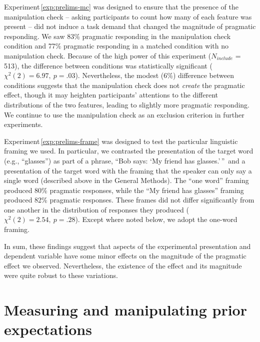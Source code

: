 \documentclass[man,noapacite]{apa2}
\newcounter{Experiment}
\newcommand{\exptref}[1]{Experiment\,\ref{#1}}
\begin{document}
\exptref{exp:prelims-mc} was designed to ensure that the presence of the manipulation check -- asking participants to count how many of each feature was present -- did not induce a task demand that changed the magnitude of pragmatic responding. We saw 83\% pragmatic responding in the manipulation check condition and 77\% pragmatic responding in a matched condition with no manipulation check. Because of the high power of this experiment ($N_{include}$ = 513), the difference between conditions was statistically significant ($\chi^2(2) = 6.97,~p = .03$). Nevertheless, the modest (6\%) difference between conditions suggests that the manipulation check does not \emph{create} the pragmatic effect, though it may heighten participants' attentions to the different distributions of the two features, leading to slightly more pragmatic responding. We continue to use the manipulation check as an exclusion criterion in further experiments.

\exptref{exp:prelims-frame} was designed to test the particular linguistic framing we used. In particular, we contrasted the presentation of the target word (e.g., ``glasses'') as part of a phrase, ``Bob says: `My friend has glasses.'\,''\ and a presentation of the target word with the framing that the speaker can only say a single word (described above in the General Methods). The ``one word'' framing produced 80\% pragmatic responses, while the ``My friend has glasses'' framing produced 82\% pragmatic responses. These frames did not differ significantly from one another in the distribution of responses they produced ($\chi^2(2) = 2.54,~p = .28$). Except where noted below, we adopt the one-word framing.

In sum, these findings suggest that aspects of the experimental presentation and dependent variable have some minor effects on the magnitude of the pragmatic effect we observed. Nevertheless, the existence of the effect and its magnitude were quite robust to these variations.

\section{Measuring and manipulating prior expectations}
\label{sec:prior}
\end{document}
